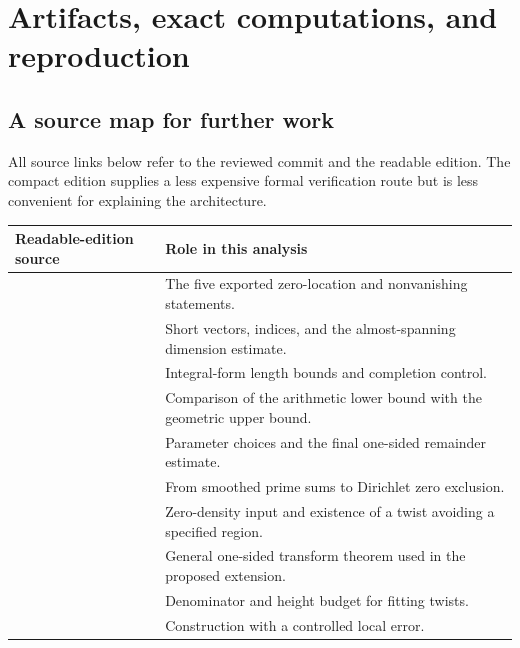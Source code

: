\section{Artifacts, exact computations, and reproduction}\label{sec:artifacts}

\subsection{A source map for further work}

All source links below refer to the reviewed commit and the readable edition. The compact edition supplies a less expensive formal verification route but is less convenient for explaining the architecture.

\begin{longtable}{@{}P{0.54\textwidth}P{0.40\textwidth}@{}}
\toprule
Readable-edition source & Role in this analysis\\
\midrule
\endhead
{} & The five exported zero-location and nonvanishing statements.\\
\addlinespace
{} & Short vectors, indices, and the almost-spanning dimension estimate.\\
\addlinespace
{} & Integral-form length bounds and completion control.\\
\addlinespace
{} & Comparison of the arithmetic lower bound with the geometric upper bound.\\
\addlinespace
{} & Parameter choices and the final one-sided remainder estimate.\\
\addlinespace
{} & From smoothed prime sums to Dirichlet zero exclusion.\\
\addlinespace
{} & Zero-density input and existence of a twist avoiding a specified region.\\
\addlinespace
{} & General one-sided transform theorem used in the proposed extension.\\
\addlinespace
{} & Denominator and height budget for fitting twists.\\
\addlinespace
{} & Construction with a controlled local error.\\
\bottomrule
\end{longtable}

